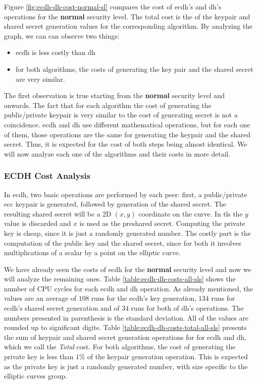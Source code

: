\documentclass{llncs}
\begin{document}
Figure \ref{fig:ecdh-dh-cost-normal-sl} compares the cost of \gls{ecdh}'s and \gls{dh}'s operations for the \textbf{normal} security level.
The total cost is the of the keypair and shared secret generation values for the corresponding algorithm. By analyzing the graph, we can can
observe two things:

\begin{itemize}
  \item \gls{ecdh} is less costly than \gls{dh}
  \item for both algorithms, the costs of generating the key pair and the shared secret are very similar.
\end{itemize}

The first observation is true starting from the \textbf{normal} security level and onwards.
The fact that for each algorithm the cost of generating the public/private keypair is very similar to the cost of generating secret is not a coincidence.
\gls{ecdh} and \gls{dh} use different mathematical operations, but for each one of them, those operations are the same for generating the keypair
and the shared secret. Thus, it is expected for the cost of both steps being almost identical. We will now analyze each one of the algorithms and
their costs in more detail.

\subsubsection{ECDH Cost Analysis}

In \gls{ecdh}, two basic operations are performed by each peer: first, a public/private \gls{ecc} keypair is generated, followed by generation of
the shared secret. The resulting shared secret will be a 2D $(x,y)$ coordinate on the curve. In \gls{tls} the $y$ value is discarded and $x$ is
used as the preshared secret. Computing the private key is cheap, since it is just a randomly generated number. The costly part is the computation of
the public key and the shared secret, since for both it involves multiplications of a scalar by a point on the elliptic curve.

We have already seen the costs of \gls{ecdh} for the \textbf{normal} security level and now we will analyze the remaining ones. Table
\ref{table:ecdh-dh-costs-all-sls} shows the number of CPU cycles for each \gls{ecdh} and \gls{dh} operation. As already mentioned, the values are
an average of $108$ runs for the \gls{ecdh}'s key generation, $134$ runs for \gls{ecdh}'s shared secret generation and of $34$ runs for both of \gls{dh}'s
operations. The numbers presented in parenthesis is the standard deviation. All of the values are rounded up to significant digits.
Table \ref{table:ecdh-dh-costs-total-all-sls} presents the sum of keypair and shared secret generation operations for for \gls{ecdh} and \gls{dh},
which we call the \textit{Total} cost. For both algorithms, the cost of generating the private key is less than $1\%$ of the keypair generation operation.
This is expected as the private key is just a randomly generated number, with size specific to the elliptic curves group.
\end{document}
